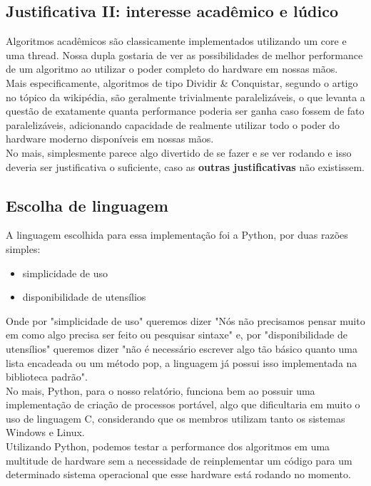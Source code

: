 \documentclass{article}
\begin{document}
\subsection{Justificativa II: interesse acadêmico e lúdico}
Algoritmos acadêmicos são classicamente implementados utilizando um core e uma thread. Nossa dupla gostaria de ver as possibilidades de melhor performance de um algoritmo ao utilizar o poder completo do hardware em nossas mãos.\\
Mais especificamente, algoritmos de tipo Dividir \& Conquistar, segundo o artigo no tópico da wikipédia, são geralmente trivialmente paralelizáveis, o que levanta a questão de exatamente quanta performance poderia ser ganha caso fossem de fato paralelizáveis, adicionando capacidade de realmente utilizar todo o poder do hardware moderno disponíveis em nossas mãos.\\
No mais, simplesmente parece algo divertido de se fazer e se ver rodando e isso deveria ser justificativa o suficiente, caso as \textbf{outras justificativas} não existissem.

\subsection{Escolha de linguagem}
A linguagem escolhida para essa implementação foi a Python, por duas razões simples:
\begin{itemize}
    \item simplicidade de uso
    \item disponibilidade de utensílios
\end{itemize}
Onde por "simplicidade de uso" queremos dizer "Nós não precisamos pensar muito em como algo precisa ser feito ou pesquisar sintaxe" e, por "disponibilidade de utensílios" queremos dizer "não é necessário escrever algo tão básico quanto uma lista encadeada ou um método pop, a linguagem já possui isso implementada na biblioteca padrão".\\
No mais, Python, para o nosso relatório, funciona bem ao possuir uma implementação de criação de processos portável, algo que dificultaria em muito o uso de linguagem C, considerando que os membros utilizam tanto os sistemas Windows e Linux.\\
Utilizando Python, podemos testar a performance dos algoritmos em uma multitude de hardware sem a necessidade de reinplementar um código para um determinado sistema operacional que esse hardware está rodando no momento.
\end{document}
